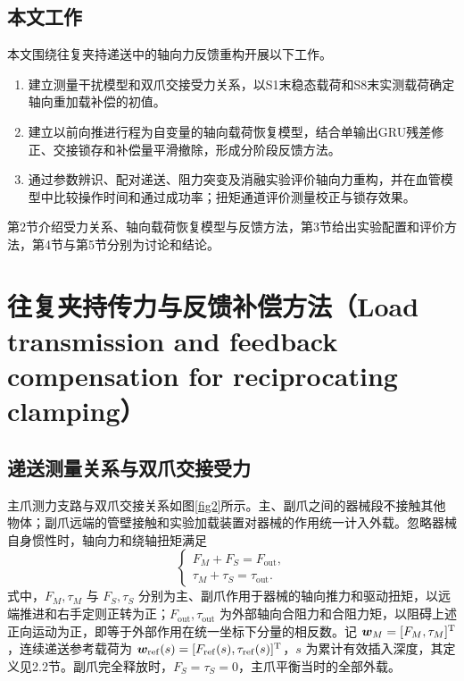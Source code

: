 \documentclass{JQRnew}
\providecommand{\RevisionColor}{\color{black}}
\newcommand{\revbegin}{\begingroup\RevisionColor}
\newcommand{\revend}{\par\endgroup}
\begin{document}
\subsection{本文工作}

\revbegin
本文围绕往复夹持递送中的轴向力反馈重构开展以下工作。
\begin{enumerate}[label=\arabic*),nosep,itemsep=0pt,topsep=2pt,partopsep=0pt,parsep=0pt,leftmargin=2\ccwd]
\item 建立测量干扰模型和双爪交接受力关系，以S1末稳态载荷和S8末实测载荷确定轴向重加载补偿的初值。
\item 建立以前向推进行程为自变量的轴向载荷恢复模型，结合单输出GRU残差修正、交接锁存和补偿量平滑撤除，形成分阶段反馈方法。
\item 通过参数辨识、配对递送、阻力突变及消融实验评价轴向力重构，并在血管模型中比较操作时间和通过成功率；扭矩通道评价测量校正与锁存效果。
\end{enumerate}
\revend

\revbegin
第2节介绍受力关系、轴向载荷恢复模型与反馈方法，第3节给出实验配置和评价方法，第4节与第5节分别为讨论和结论。
\revend

\revbegin
\section{往复夹持传力与反馈补偿方法（Load transmission and feedback compensation for reciprocating clamping）}
\revend

\subsection{递送测量关系与双爪交接受力}

\revbegin
主爪测力支路与双爪交接关系如图\ref{fig2}所示。主、副爪之间的器械段不接触其他物体；副爪远端的管壁接触和实验加载装置对器械的作用统一计入外载。忽略器械自身惯性时，轴向力和绕轴扭矩满足
\begin{equation}
\label{eq:balance}
\begin{cases}
F_M+F_S=F_{\mathrm{out}},\\
\tau_M+\tau_S=\tau_{\mathrm{out}}.
\end{cases}
\end{equation}
式中，$F_M,\tau_M$ 与 $F_S,\tau_S$ 分别为主、副爪作用于器械的轴向推力和驱动扭矩，以远端推进和右手定则正转为正；$F_{\mathrm{out}},\tau_{\mathrm{out}}$ 为外部轴向合阻力和合阻力矩，以阻碍上述正向运动为正，即等于外部作用在统一坐标下分量的相反数。记 $\bm w_M=[F_M,\tau_M]^{\rm T}$，连续递送参考载荷为 $\bm w_{\mathrm{ref}}(s)=[F_{\mathrm{ref}}(s),\tau_{\mathrm{ref}}(s)]^{\rm T}$，$s$ 为累计有效插入深度，其定义见2.2节。副爪完全释放时，$F_S=\tau_S=0$，主爪平衡当时的全部外载。
\revend
\end{document}
